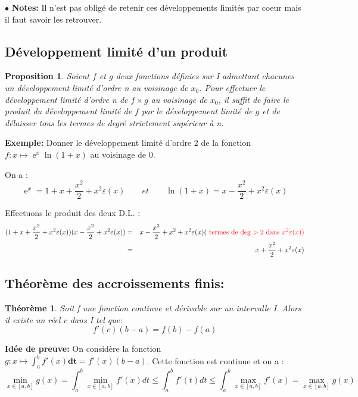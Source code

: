 \documentclass[a4paper]{article}
\theoremstyle{break}
\newtheorem{theo}{Théorème}[section]
\newtheorem{prop}{Proposition}[section]
\DeclareMathOperator{\e}{e} %
\newcommand{\note}{$\bullet$ \textbf{Notes: }}
\begin{document}
\note Il n'est pas obligé de retenir ces développements limités par
coeur mais il faut savoir les retrouver.

\subsection{Développement limité d'un produit}
\begin{prop}
  Soient $f$ et $g$ deux fonctions définies sur I admettant chacunes un développement
  limité d'ordre n au voisinage de $x_0$. Pour effectuer le développement limité
  d'ordre n de  $f \times g$ au voisinage de $x_0$, il suffit de faire le produit
  du développement limité de $f$ par le développement limité de $g$ et de délaisser
  tous les termes de degré strictement supérieur à n.
\end{prop}

\textbf{Exemple: } Donner le développement limité d'ordre 2 de la fonction
$f: x \mapsto \e^x \ln(1+x)$ au voisinage de 0.

On a :
\[
  \e^x = 1 + x + \frac{x^2}{2} + x^2\varepsilon(x) \qquad { et } \qquad
  \ln(1+x) = x - \frac{x^2}{2} +  x^2\varepsilon(x)
\]

Effectuons le produit des deux D.L. :
\begin{eqnarray*}
  (1 + x + \frac{x^2}{2} + x^2\varepsilon(x))(x - \frac{x^2}{2} +  x^2\varepsilon(x))
  &=& x - \frac{x^2}{2} + x^2 + x^2\varepsilon(x) (\color{red}{\text{ termes de deg $>2$ dans $x^2\varepsilon(x)$})} \\
  &=& x + \frac{x^2}{2} + x^2\varepsilon(x)
\end{eqnarray*}

\subsection{Théorème des accroissements finis:}
\begin{theo}
  Soit f une fonction continue et dérivable sur un intervalle I. Alors
  il existe un réel c dans I tel que:
  \[
    f'(c)(b-a) = f(b) - f(a)
  \]
\end{theo}

\textbf{Idée de preuve: }
On considère la fonction $g: x \mapsto \int_a^b f'(x) \mathbf{dt} =
f'(x) (b-a)$. Cette fonction est continue et on a :
\[
  \min \limits_{x \in [a,b]} g(x) = \int_a^b \min \limits_{x \in
    [a,b]} f'(x) dt
  \leq  \int_a^b f'(t) dt
  \leq \int_a^b \max \limits_{x \in [a,b]} f'(x) = \max \limits_{x \in [a,b]} g(x)
\]
\end{document}
